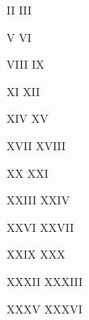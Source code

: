 \documentclass[booklanguage=english]{byrnebook}
\begin{document}
\vspace*{\fill}

%
{II}{}%
{III}{}

\vfill

%
{V}{}%
{VI}{}

\vfill

%
{VIII}{}%
{IX}{}

\vfill

%
{XI}{}%
{XII}{}

\vspace*{\fill}
\pagebreak

\vspace*{\fill}

%
{XIV}{}%
{XV}{}

\vfill

%
{XVII}{}%
{XVIII}{}

\vfill

%
{XX}{}%
{XXI}{}

\vfill

%
{XXIII}{}%
{XXIV}{}

\vspace*{\fill}
\pagebreak

\vspace*{\fill}

%
{XXVI}{}%
{XXVII}{}

\vfill

%
{XXIX}{}%
{XXX}{}

\vfill

%
{XXXII}{}%
{XXXIII}{}

\vfill

%
{XXXV}{}%
{XXXVI}{}
\end{document}
